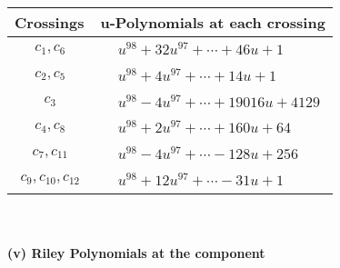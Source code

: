 \documentclass[1p]{elsarticle_modified}
\theoremstyle{definition}
\begin{document}
\begin{tabular}{m{50pt}|m{274pt}}
Crossings & \hspace{64pt}u-Polynomials at each crossing \\
\hline $$\begin{aligned}c_{1},c_{6}\end{aligned}$$&$\begin{aligned}
&u^{98}+32 u^{97}+\cdots+46 u+1
\end{aligned}$\\
\hline $$\begin{aligned}c_{2},c_{5}\end{aligned}$$&$\begin{aligned}
&u^{98}+4 u^{97}+\cdots+14 u+1
\end{aligned}$\\
\hline $$\begin{aligned}c_{3}\end{aligned}$$&$\begin{aligned}
&u^{98}-4 u^{97}+\cdots+19016 u+4129
\end{aligned}$\\
\hline $$\begin{aligned}c_{4},c_{8}\end{aligned}$$&$\begin{aligned}
&u^{98}+2 u^{97}+\cdots+160 u+64
\end{aligned}$\\
\hline $$\begin{aligned}c_{7},c_{11}\end{aligned}$$&$\begin{aligned}
&u^{98}-4 u^{97}+\cdots-128 u+256
\end{aligned}$\\
\hline $$\begin{aligned}c_{9},c_{10},c_{12}\end{aligned}$$&$\begin{aligned}
&u^{98}+12 u^{97}+\cdots-31 u+1
\end{aligned}$\\
\hline
\end{tabular}\\~\\
\newpage\renewcommand{\arraystretch}{1}
\flushleft \textbf{(v) Riley Polynomials at the component}\newline \\
\end{document}
